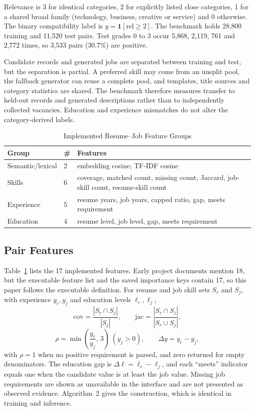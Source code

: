 \documentclass[conference]{IEEEtran}
\begin{document}
Relevance is 3 for identical categories, 2 for explicitly listed close categories, 1 for a shared broad family (technology, business, creative or service) and 0 otherwise. The binary compatibility label is $y=\mathbf{1}[\mathrm{rel}\ge 2]$. The benchmark holds 28,800 training and 11,520 test pairs. Test grades 0 to 3 occur 5,868, 2,119, 761 and 2,772 times, so 3,533 pairs (30.7\%) are positive.

Candidate records and generated jobs are separated between training and test, but the separation is partial. A preferred skill may come from an unsplit pool, the fallback generator can reuse a complete pool, and templates, title sources and category statistics are shared. The benchmark therefore measures transfer to held-out records and generated descriptions rather than to independently collected vacancies. Education and experience mismatches do not alter the category-derived labels.

\begin{table}[!t]
\caption{Implemented Resume--Job Feature Groups}
\label{tab:features}
\centering
\small
\begin{tabular}{@{}llp{4.7cm}@{}}
\toprule
Group & \# & Features \\
\midrule
Semantic/lexical & 2 & embedding cosine; TF-IDF cosine \\
Skills & 6 & coverage, matched count, missing count, Jaccard, job-skill count, resume-skill count \\
Experience & 5 & resume years, job years, capped ratio, gap, meets requirement \\
Education & 4 & resume level, job level, gap, meets requirement \\
\bottomrule
\end{tabular}
\end{table}

\subsection{Pair Features}
Table~\ref{tab:features} lists the 17 implemented features. Early project documents mention 18, but the executable feature list and the saved importance keys contain 17, so this paper follows the executable definition. For resume and job skill sets $S_r$ and $S_j$, with experience $y_r, y_j$ and education levels $\ell_r, \ell_j$,
\begin{equation}
\mathrm{cov}=\frac{|S_r\cap S_j|}{|S_j|},\qquad \mathrm{jac}=\frac{|S_r\cap S_j|}{|S_r\cup S_j|},
\end{equation}
\begin{equation}
\rho=\min\!\left(\frac{y_r}{y_j},\,3\right)\ (y_j>0),\qquad \Delta y=y_r-y_j,
\end{equation}
with $\rho=1$ when no positive requirement is parsed, and zero returned for empty denominators. The education gap is $\Delta\ell=\ell_r-\ell_j$, and each ``meets'' indicator equals one when the candidate value is at least the job value. Missing job requirements are shown as unavailable in the interface and are not presented as observed evidence. Algorithm~2 gives the construction, which is identical in training and inference.
\end{document}
